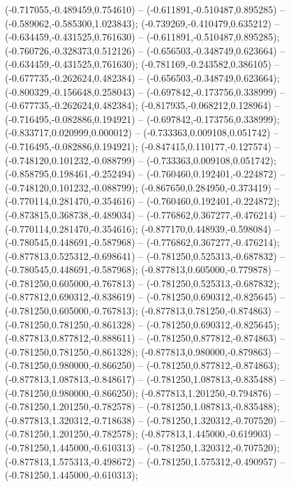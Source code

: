  (-0.717055,-0.489459,0.754610) -- (-0.611891,-0.510487,0.895285) -- (-0.589062,-0.585300,1.023843);
 (-0.739269,-0.410479,0.635212) -- (-0.634459,-0.431525,0.761630) -- (-0.611891,-0.510487,0.895285);
 (-0.760726,-0.328373,0.512126) -- (-0.656503,-0.348749,0.623664) -- (-0.634459,-0.431525,0.761630);
 (-0.781169,-0.243582,0.386105) -- (-0.677735,-0.262624,0.482384) -- (-0.656503,-0.348749,0.623664);
 (-0.800329,-0.156648,0.258043) -- (-0.697842,-0.173756,0.338999) -- (-0.677735,-0.262624,0.482384);
 (-0.817935,-0.068212,0.128964) -- (-0.716495,-0.082886,0.194921) -- (-0.697842,-0.173756,0.338999);
 (-0.833717,0.020999,0.000012) -- (-0.733363,0.009108,0.051742) -- (-0.716495,-0.082886,0.194921);
 (-0.847415,0.110177,-0.127574) -- (-0.748120,0.101232,-0.088799) -- (-0.733363,0.009108,0.051742);
 (-0.858795,0.198461,-0.252494) -- (-0.760460,0.192401,-0.224872) -- (-0.748120,0.101232,-0.088799);
 (-0.867650,0.284950,-0.373419) -- (-0.770114,0.281470,-0.354616) -- (-0.760460,0.192401,-0.224872);
 (-0.873815,0.368738,-0.489034) -- (-0.776862,0.367277,-0.476214) -- (-0.770114,0.281470,-0.354616);
 (-0.877170,0.448939,-0.598084) -- (-0.780545,0.448691,-0.587968) -- (-0.776862,0.367277,-0.476214);
 (-0.877813,0.525312,-0.698641) -- (-0.781250,0.525313,-0.687832) -- (-0.780545,0.448691,-0.587968);
 (-0.877813,0.605000,-0.779878) -- (-0.781250,0.605000,-0.767813) -- (-0.781250,0.525313,-0.687832);
 (-0.877812,0.690312,-0.838619) -- (-0.781250,0.690312,-0.825645) -- (-0.781250,0.605000,-0.767813);
 (-0.877813,0.781250,-0.874863) -- (-0.781250,0.781250,-0.861328) -- (-0.781250,0.690312,-0.825645);
 (-0.877813,0.877812,-0.888611) -- (-0.781250,0.877812,-0.874863) -- (-0.781250,0.781250,-0.861328);
 (-0.877813,0.980000,-0.879863) -- (-0.781250,0.980000,-0.866250) -- (-0.781250,0.877812,-0.874863);
 (-0.877813,1.087813,-0.848617) -- (-0.781250,1.087813,-0.835488) -- (-0.781250,0.980000,-0.866250);
 (-0.877813,1.201250,-0.794876) -- (-0.781250,1.201250,-0.782578) -- (-0.781250,1.087813,-0.835488);
 (-0.877813,1.320312,-0.718638) -- (-0.781250,1.320312,-0.707520) -- (-0.781250,1.201250,-0.782578);
 (-0.877813,1.445000,-0.619903) -- (-0.781250,1.445000,-0.610313) -- (-0.781250,1.320312,-0.707520);
 (-0.877813,1.575313,-0.498672) -- (-0.781250,1.575312,-0.490957) -- (-0.781250,1.445000,-0.610313);

